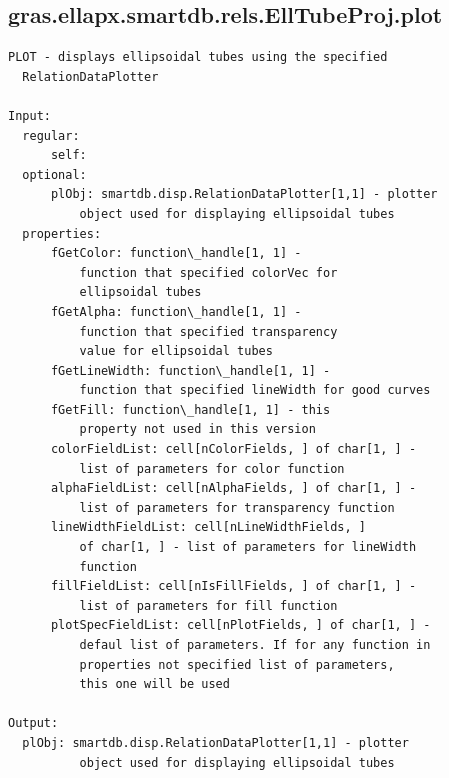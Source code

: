 \documentclass[letterpaper,10pt,english]{sphinxmanual}
\begin{document}
\subsection{gras.ellapx.smartdb.rels.EllTubeProj.plot}
\label{chap_functions:gras-ellapx-smartdb-rels-elltubeproj-plot}
\begin{Verbatim}[commandchars=\\\{\}]
PLOT - displays ellipsoidal tubes using the specified
  RelationDataPlotter

Input:
  regular:
      self:
  optional:
      plObj: smartdb.disp.RelationDataPlotter[1,1] - plotter
          object used for displaying ellipsoidal tubes
  properties:
      fGetColor: function\_handle[1, 1] -
          function that specified colorVec for
          ellipsoidal tubes
      fGetAlpha: function\_handle[1, 1] -
          function that specified transparency
          value for ellipsoidal tubes
      fGetLineWidth: function\_handle[1, 1] -
          function that specified lineWidth for good curves
      fGetFill: function\_handle[1, 1] - this
          property not used in this version
      colorFieldList: cell[nColorFields, ] of char[1, ] -
          list of parameters for color function
      alphaFieldList: cell[nAlphaFields, ] of char[1, ] -
          list of parameters for transparency function
      lineWidthFieldList: cell[nLineWidthFields, ]
          of char[1, ] - list of parameters for lineWidth
          function
      fillFieldList: cell[nIsFillFields, ] of char[1, ] -
          list of parameters for fill function
      plotSpecFieldList: cell[nPlotFields, ] of char[1, ] -
          defaul list of parameters. If for any function in
          properties not specified list of parameters,
          this one will be used

Output:
  plObj: smartdb.disp.RelationDataPlotter[1,1] - plotter
          object used for displaying ellipsoidal tubes
\end{Verbatim}
\end{document}
